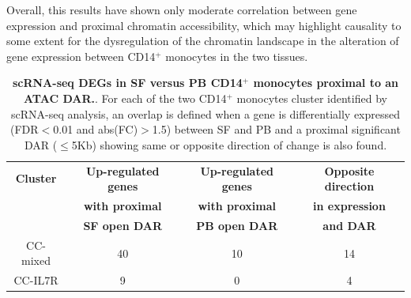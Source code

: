 Overall, this results have shown only moderate correlation between gene expression and proximal chromatin accessibility, which may highlight causality to some extent for the dysregulation of the chromatin landscape in the alteration of gene expression between CD14$^+$ monocytes in the two tissues.
  
\begin{table}[htbp]
\centering
\begin{tabular}{@{} c c c c}
\toprule
\textbf{Cluster} & \textbf{Up-regulated genes}        &  \textbf{Up-regulated genes }  & \textbf{Opposite direction} \\
                   & \textbf{with proximal}           &  \textbf{with proximal}      & \textbf{in expression } \\
									 &	\textbf{SF open DAR}				    &  \textbf{PB open DAR}        & \textbf{and DAR}\\
\midrule
\midrule
 CC-mixed         & 40                                       &  10                                & 14 \\
 CC-IL7R          & 9                                        &  0                                 & 4 \\
\bottomrule
\end{tabular}
\medskip %
\caption[scRNA-seq DEGs in SF versus PB CD14$^+$ monocytes proximal to a DAR in Fast-ATAC.]{\textbf{scRNA-seq DEGs in SF versus PB CD14$^+$ monocytes proximal to an ATAC DAR.}. For each of the two CD14$^+$ monocytes cluster identified by scRNA-seq analysis, an overlap is defined when a gene is differentially expressed (FDR$<$0.01 and abs(FC)$>$1.5) between SF and PB and a proximal significant DAR ($\leq$5Kb) showing same or opposite direction of change is also found.}
\label{tab:PSA_10X_CD14_clusters_and_ATAC_overlap}
\end{table}


